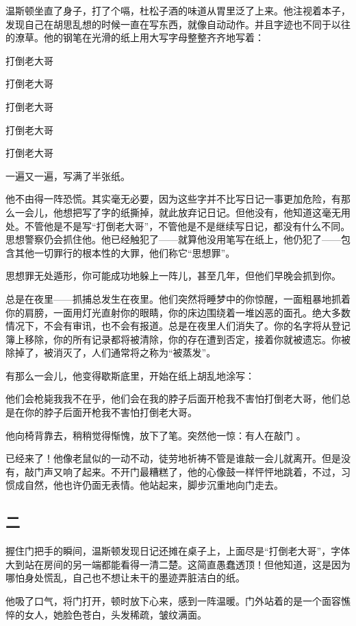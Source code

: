 温斯顿坐直了身子，打了个嗝，杜松子酒的味道从胃里泛了上来。他注视着本子，发现自己在胡思乱想的时候一直在写东西，就像自动动作。并且字迹也不同于以往的潦草。他的钢笔在光滑的纸上用大写字母整整齐齐地写着：

打倒老大哥

打倒老大哥

打倒老大哥

打倒老大哥

打倒老大哥

一遍又一遍，写满了半张纸。

他不由得一阵恐慌。其实毫无必要，因为这些字并不比写日记一事更加危险，有那么一会儿，他想把写了字的纸撕掉，就此放弃记日记。但他没有，他知道这毫无用处。不管他是不是写``打倒老大哥''，不管他是不是继续写日记，都没有什么不同。思想警察仍会抓住他。他已经触犯了------就算他没用笔写在纸上，他仍犯了------包含其他一切罪行的根本性的大罪，他们称它``思想罪''。

思想罪无处遁形，你可能成功地躲上一阵儿，甚至几年，但他们早晚会抓到你。

总是在夜里------抓捕总发生在夜里。他们突然将睡梦中的你惊醒，一面粗暴地抓着你的肩膀，一面用灯光直射你的眼睛，你的床边围绕着一堆凶恶的面孔。绝大多数情况下，不会有审讯，也不会有报道。总是在夜里人们消失了。你的名字将从登记簿上移除，你的所有记录都将被清除，你的存在遭到否定，接着你就被遗忘。你被除掉了，被消灭了，人们通常将之称为``被蒸发''。

有那么一会儿，他变得歇斯底里，开始在纸上胡乱地涂写：

他们会枪毙我我不在乎，他们会在我的脖子后面开枪我不害怕打倒老大哥，他们总是在你的脖子后面开枪我不害怕打倒老大哥。

他向椅背靠去，稍稍觉得惭愧，放下了笔。突然他一惊：有人在敲门 。

已经来了！他像老鼠似的一动不动，徒劳地祈祷不管是谁敲一会儿就离开。但是没有，敲门声又响了起来。不开门最糟糕了，他的心像鼓一样怦怦地跳着，不过，习惯成自然，他也许仍面无表情。他站起来，脚步沉重地向门走去。

\subsection{二}\label{ux4e8c}

握住门把手的瞬间，温斯顿发现日记还摊在桌子上，上面尽是``打倒老大哥''，字体大到站在房间的另一端都能看得一清二楚。这简直愚蠢透顶！但他知道，这是因为哪怕身处慌乱，自己也不想让未干的墨迹弄脏洁白的纸。

他吸了口气，将门打开，顿时放下心来，感到一阵温暖。门外站着的是一个面容憔悴的女人，她脸色苍白，头发稀疏，皱纹满面。


